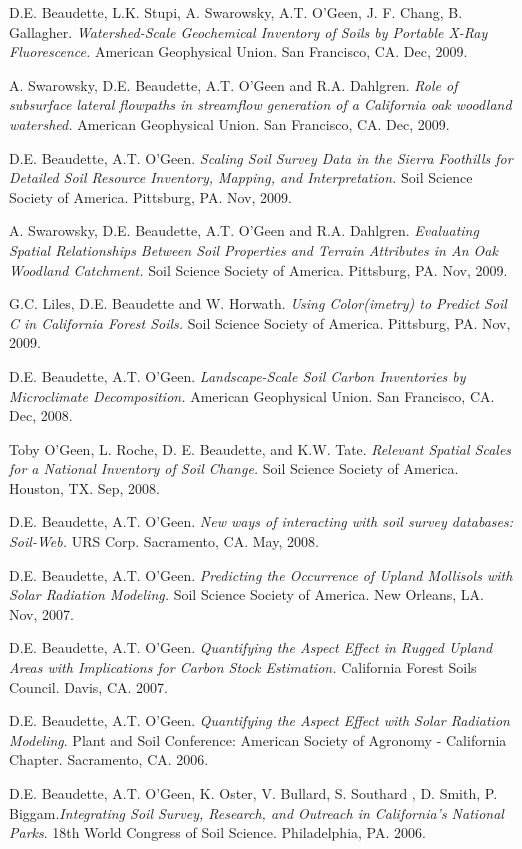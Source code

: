 \documentclass[overlapped,line,10pt,letterpaper]{res}
\begin{document}
\begin{resume}
D.E. Beaudette, L.K. Stupi, A. Swarowsky, A.T. O'Geen, J. F. Chang, B. Gallagher. {\em Watershed-Scale Geochemical Inventory of Soils by Portable X-Ray Fluorescence.} American Geophysical Union. San Francisco, CA. Dec, 2009.

A. Swarowsky, D.E. Beaudette, A.T. O'Geen and R.A. Dahlgren. {\em Role of subsurface lateral flowpaths in streamflow generation of a California oak woodland watershed.} American Geophysical Union. San Francisco, CA. Dec, 2009.

D.E. Beaudette, A.T. O'Geen. {\em Scaling Soil Survey Data in the Sierra Foothills for Detailed Soil Resource Inventory, Mapping, and Interpretation.} Soil Science Society of America. Pittsburg, PA. Nov, 2009.

A. Swarowsky, D.E. Beaudette, A.T. O'Geen and R.A. Dahlgren. {\em Evaluating Spatial Relationships Between Soil Properties and Terrain Attributes in An Oak Woodland Catchment.} Soil Science Society of America. Pittsburg, PA. Nov, 2009.

G.C. Liles, D.E. Beaudette and W. Horwath. {\em Using Color(imetry) to Predict Soil C in California Forest Soils.} Soil Science Society of America. Pittsburg, PA. Nov, 2009.

D.E. Beaudette, A.T. O'Geen. {\em Landscape-Scale Soil Carbon Inventories by Microclimate Decomposition.} American Geophysical Union. San Francisco, CA. Dec, 2008.

Toby O'Geen, L. Roche, D. E. Beaudette, and K.W. Tate. {\em Relevant Spatial Scales for a National Inventory of Soil Change.} Soil Science Society of America. Houston, TX. Sep, 2008.

D.E. Beaudette, A.T. O'Geen. {\em New ways of interacting with soil survey databases: Soil-Web.} URS Corp. Sacramento, CA. May, 2008.

D.E. Beaudette, A.T. O'Geen. {\em Predicting the Occurrence of Upland Mollisols with Solar Radiation Modeling.} Soil Science Society of America. New Orleans, LA. Nov, 2007.

D.E. Beaudette, A.T. O'Geen. {\em Quantifying the Aspect Effect in Rugged Upland Areas with Implications for Carbon Stock Estimation.} California Forest Soils Council. Davis, CA. 2007.

D.E. Beaudette, A.T. O'Geen. {\em Quantifying the Aspect Effect with Solar Radiation Modeling}. Plant and Soil Conference: American Society of Agronomy - California Chapter. Sacramento, CA. 2006.

D.E. Beaudette, A.T. O'Geen, K. Oster, V. Bullard,  S. Southard , D. Smith, P. Biggam.{\em Integrating Soil Survey, Research, and Outreach in California's National Parks}. 18th World Congress of Soil Science. Philadelphia, PA. 2006.


\end{resume}
\end{document}
